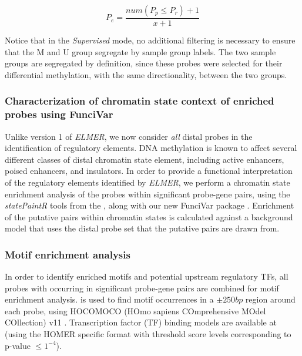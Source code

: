 \begin{equation}
	P_e = \frac{num(P_p \leq P_r)+ 1}{x+1}
\end{equation}

Notice that in the \textit{Supervised} mode, no additional filtering is
necessary to ensure that the M and U group segregate by sample group labels.
The two sample groups are segregated by definition, since these probes were
selected for their differential methylation, with the same directionality,
between the two groups.



\subsubsection{Characterization of chromatin state context of enriched probes using FunciVar}

Unlike version 1 of \textit{ELMER}, we now consider \textit{all} distal probes
in the identification of regulatory elements. DNA methylation is known to affect
several different classes of distal chromatin state element, including active
enhancers, poised enhancers, and insulators. In order to provide a functional
interpretation of the regulatory elements identified by \textit{ELMER},
we perform a chromatin state enrichment analysis of the probes within significant
probe-gene pairs, using the \textit{statePaintR} tools from the  \cite{statepaintr},
along with our new FunciVar package \cite{funcivar}. Enrichment of the putative pairs
 within chromatin states is calculated against a background model that uses the distal
 probe set that the putative pairs are drawn from.

\subsubsection*{Motif enrichment analysis}
In order to identify enriched motifs and potential upstream regulatory TFs,
all probes with occurring in significant probe-gene pairs are combined for
motif enrichment analysis. 
 \cite{heinz2010simple} is used to find motif occurrences in a $\pm 250bp$ region
 around each probe, using HOCOMOCO (HOmo sapiens COmprehensive MOdel COllection)
 v11 \cite{kulakovskiy2016hocomoco}. Transcription factor (TF) binding models are
 available at  (using the HOMER specific
 format with threshold score levels corresponding to p-value $ \leq 1^{-4}$).

